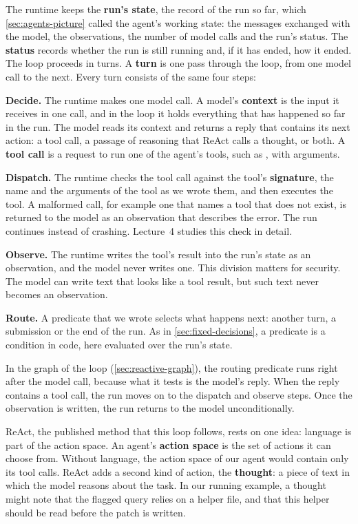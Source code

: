 The runtime keeps the \textbf{run's state}, the record of the run so far, which
\cref{sec:agents-picture} called the agent's working state: the messages exchanged with the model,
the observations, the number of model calls and the run's status. The
\textbf{status} records whether the run is still running and, if it has ended, how it ended. The
loop proceeds in turns. A \textbf{turn} is one pass through the loop, from one model call to the
next. Every turn consists of the same four steps:
\bi
\item \textbf{Decide.} The runtime makes one model call. A model's \textbf{context} is the input it
receives in one call, and in the loop it holds everything that has happened so far in the run. The
model reads its context and returns a reply that contains its next action: a tool call, a passage
of reasoning that ReAct calls a thought, or both. A \textbf{tool call} is a request to run one of the agent's tools, such as
, with arguments.
\item \textbf{Dispatch.} The runtime checks the tool call against the tool's \textbf{signature}, the
name and the arguments of the tool as we wrote them, and then executes the tool. A malformed call,
for example one that names a tool that does not exist, is returned to the model as an observation
that describes the error. The run continues instead of crashing. Lecture~4 studies this check in
detail.
\item \textbf{Observe.} The runtime writes the tool's result into the run's state as an
observation, and the model never writes one. This division matters for security. The model can
write text that looks like a tool result, but such text never becomes an observation.
\item \textbf{Route.} A predicate that we wrote selects what happens next: another turn, a
submission or the end of the run. As in \cref{sec:fixed-decisions}, a predicate is a condition in
code, here evaluated over the run's state.
\ei

In the graph of the loop (\cref{sec:reactive-graph}), the routing predicate runs right after the
model call, because what it tests is the model's reply. When the reply contains a tool call, the run
moves on to the dispatch and observe steps. Once the observation is written, the run returns to the
model unconditionally.

ReAct, the published method that this loop follows, rests on one idea: language is part of the
action space. An agent's \textbf{action space} is the set of actions it can choose from. Without
language, the action space of our agent would contain only its tool calls. ReAct adds a second kind
of action, the \textbf{thought}: a piece of text in which the model reasons about the task. In our
running example, a thought might note that the flagged query relies on a helper file, and that this
helper should be read before the patch is written.

